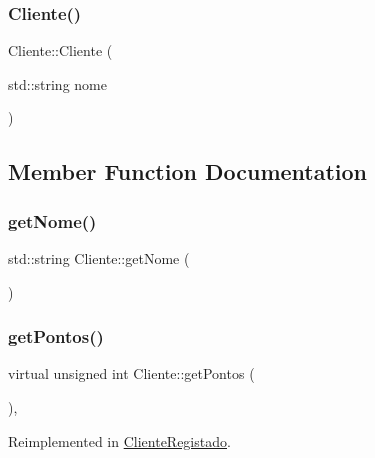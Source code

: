 \subsubsection{\texorpdfstring{Cliente()}{Cliente()}}
{\footnotesize\ttfamily Cliente\+::\+Cliente (\begin{DoxyParamCaption}\item[{std\+::string}]{nome }\end{DoxyParamCaption})}



\subsection{Member Function Documentation}
\mbox{\label{classCliente_a09b99b4140f32bdd3bf486cc2ac5ee27}} 
\subsubsection{\texorpdfstring{get\+Nome()}{getNome()}}
{\footnotesize\ttfamily std\+::string Cliente\+::get\+Nome (\begin{DoxyParamCaption}{ }\end{DoxyParamCaption})\hspace{0.3cm}{\ttfamily [inline]}}

\mbox{\label{classCliente_a4bcd51f0d9a0bfe7d9d47074ac4e65de}} 
\subsubsection{\texorpdfstring{get\+Pontos()}{getPontos()}}
{\footnotesize\ttfamily virtual unsigned int Cliente\+::get\+Pontos (\begin{DoxyParamCaption}{ }\end{DoxyParamCaption})\hspace{0.3cm}{\ttfamily [inline]}, {\ttfamily [virtual]}}



Reimplemented in \hyperlink{classClienteRegistado_a0118e31f16e4dce542f5e1d124d26c61}{Cliente\+Registado}.

\mbox{\label{classCliente_acb60d8bf04134b986ae56a79db8beaaf}} 
